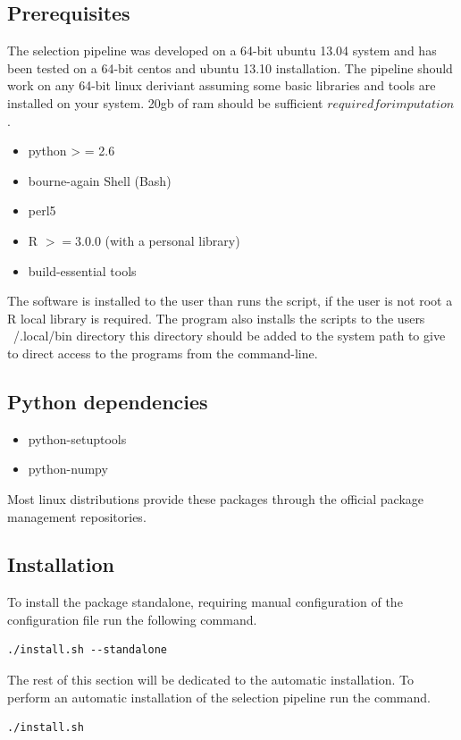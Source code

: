 \documentclass[a4paper,10pt]{article}
\begin{document}
\subsection{Prerequisites}
The selection pipeline was developed on a 64-bit ubuntu 13.04 system and has been tested on a 64-bit centos and ubuntu 13.10 installation. The pipeline should work on any 64-bit linux deriviant assuming some basic libraries and tools are installed on your system. 20gb of ram should be sufficient \(required for imputation\).
\begin{itemize}
\item python > = 2.6 
\item bourne-again Shell (Bash)
\item perl5
\item R \( >= 3.0.0 \) (with a personal library)
\item build-essential tools
\end{itemize}
The software is installed to the user than runs the script, if the user is not root a R local library is required. The program also installs the scripts to the users ~/.local/bin directory this directory should be added to the system path to give to direct access to the programs from the command-line.  

\subsection{Python dependencies}
\begin{itemize}
\item python-setuptools
\item python-numpy
\end{itemize}
Most linux distributions provide these packages through the official package management repositories.
\subsection{Installation}
To install the package standalone, requiring manual configuration of the configuration file run the following command.\\

\begin{verbatim}
./install.sh --standalone
\end{verbatim}

The rest of this section will be dedicated to the automatic installation. To perform an automatic installation of the selection pipeline run the command.\\
\begin{verbatim}
./install.sh
\end{verbatim}
\end{document}
